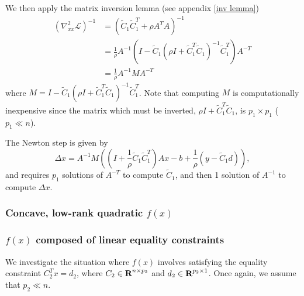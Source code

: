 \documentclass{article}
\newcommand{\inv}[1]{\frac{1}{#1}}
\newcommand{\tC}{\tilde{C}}
\begin{document}
We then apply the matrix inversion lemma (see appendix \ref{inv lemma})
    \begin{equation}\begin{split}
    (\nabla_{xx}^2 \mathcal{L})^{-1} &= (\tC_1\tC_1^T + \rho A^T A)^{-1} \\
        &= \inv{\rho} A^{-1} 
            (I - \tC_1(\rho I + \tC_1^T\tC_1)^{-1}\tC_1^T) A^{-T} \\
        &= \inv{\rho} A^{-1} M A^{-T}
    \end{split}\end{equation}
    where $M = I - \tC_1(\rho I + \tC_1^T\tC_1)^{-1}\tC_1^T$.
Note that computing $M$ is computationally inexpensive
    since the matrix which must be inverted, $\rho I + \tC_1^T\tC_1$,
    is $p_1 \times p_1$ ($p_1 \ll n$).

The Newton step is given by
    \begin{equation}
    \Delta x = A^{-1}M ((I + \inv{\rho}\tC_1\tC_1^T)Ax
        - b + \inv{\rho}(y - \tC_1 d)),
    \end{equation}
    and requires $p_1$ solutions of $A^{-T}$ to compute $\tC_1$, 
    and then 1 solution of $A^{-1}$ to compute $\Delta x$.

\subsubsection{Concave, low-rank quadratic $f(x)$}

\subsubsection{$f(x)$ composed of linear equality constraints}
We investigate the situation where $f(x)$ involves
    satisfying the equality constraint $C_2^T x = d_2$,
    where $C_2 \in {\mbox{\bf R}}^{n \times p_2}$
    and $d_2 \in {\mbox{\bf R}}^{p_2 \times 1}$.
Once again, we assume that $p_2 \ll n$.
\end{document}
